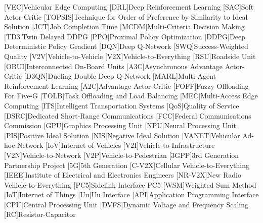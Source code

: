 [VEC]{Vehicular Edge Computing}
[DRL]{Deep Reinforcement Learning}
[SAC]{Soft Actor-Critic}
[TOPSIS]{Technique for Order of Preference by Similarity to Ideal Solution}
[JCT]{Job Completion Time}
[MCDM]{Multi-Criteria Decision Making}
[TD3]{Twin Delayed DDPG}
[PPO]{Proximal Policy Optimization}
[DDPG]{Deep Deterministic Policy Gradient}
[DQN]{Deep Q-Network}
[SWQ]{Success-Weighted Quality}
[V2V]{Vehicle-to-Vehicle}
[V2X]{Vehicle-to-Everything}
[RSU]{Roadside Unit}
[OBUI]{Interconnected On-Board Units}
[A3C]{Asynchronous Advantage Actor-Critic}
[D3QN]{Dueling Double Deep Q-Network}
[MARL]{Multi-Agent Reinforcement Learning}
[A2C]{Advantage Actor-Critic}
[FOFF]{Fuzzy Offloading For Five-G}
[TOLB]{Task Offloading and Load Balancing}
[MEC]{Multi-Access Edge Computing}
[ITS]{Intelligent Transportation Systems}
[QoS]{Quality of Service}
[DSRC]{Dedicated Short-Range Communications}
[FCC]{Federal Communications Commission}
[GPU]{Graphics Processing Unit}
[NPU]{Neural Processing Unit}
[PIS]{Positive Ideal Solution}
[NIS]{Negative Ideal Solution}
[VANET]{Vehicular Ad-hoc Network}
[IoV]{Internet of Vehicles}
[V2I]{Vehicle-to-Infrastructure}
[V2N]{Vehicle-to-Network}
[V2P]{Vehicle-to-Pedestrian}
[3GPP]{3rd Generation Partnership Project}
[5G]{5th Generation}
[C-V2X]{Cellular Vehicle-to-Everything}
[IEEE]{Institute of Electrical and Electronics Engineers}
[NR-V2X]{New Radio Vehicle-to-Everything}
[PC5]{Sidelink Interface PC5}
[WSM]{Weighted Sum Method}
[IoT]{Internet of Things}
[Uu]{Uu Interface}
[API]{Application Programming Interface}
[CPU]{Central Processing Unit}
[DVFS]{Dynamic Voltage and Frequency Scaling}
[RC]{Resistor-Capacitor}
